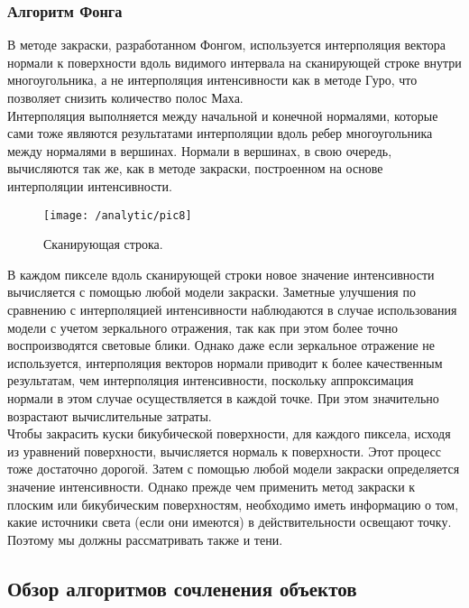 \subsubsection{Алгоритм Фонга}

В методе закраски, разработанном Фонгом, используется интерполяция вектора нормали к поверхности вдоль видимого интервала на сканирующей строке внутри многоугольника, а не интерполяция интенсивности как в методе Гуро, что позволяет снизить количество полос Маха.\\

Интерполяция выполняется между начальной и конечной нормалями, которые сами тоже являются результатами интерполяции вдоль ребер многоугольника между нормалями в вершинах. Нормали в вершинах, в свою очередь, вычисляются так же, как в методе закраски, построенном на основе интерполяции интенсивности.

\begin{figure}[H]
\center
\texttt{[image: /analytic/pic8]}
\caption{Сканирующая строка.}
\end{figure}

В каждом пикселе вдоль сканирующей строки новое значение интенсивности вычисляется с помощью любой модели закраски. Заметные улучшения по сравнению с интерполяцией интенсивности наблюдаются в случае использования модели с учетом зеркального отражения, так как при этом более точно воспроизводятся световые блики. Однако даже если зеркальное отражение не используется, интерполяция векторов нормали приводит к более качественным результатам, чем интерполяция интенсивности, поскольку аппроксимация нормали в этом случае осуществляется в каждой точке. При этом значительно возрастают вычислительные затраты.\\

Чтобы закрасить куски бикубической поверхности, для каждого пиксела, исходя из уравнений поверхности, вычисляется нормаль к поверхности. Этот процесс тоже достаточно дорогой. Затем с помощью любой модели закраски определяется значение интенсивности. Однако прежде чем применить метод закраски к плоским или бикубическим поверхностям, необходимо иметь информацию о том, какие источники света (если они имеются) в действительности освещают точку. Поэтому мы должны рассматривать также и тени.

\subsection{Обзор алгоритмов сочленения объектов}\label{subsec:analytic1.3}

